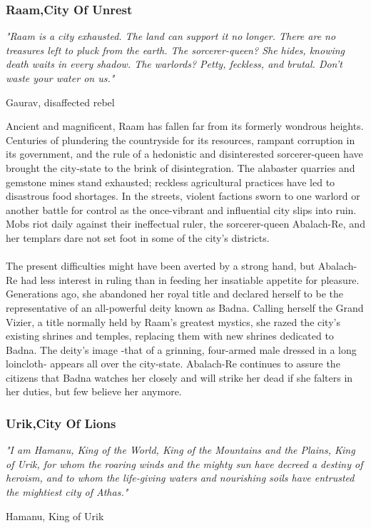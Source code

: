 \begin{multicols}{2}
\subsubsection{Raam,City Of Unrest}
\epigraph{\textit{
"Raam is a city exhausted. The land can support it no
longer. There are no treasures left to pluck from the earth.
The sorcerer-queen? She hides, knowing death waits in
every shadow. The warlords? Petty, feckless, and brutal.
Don’t waste your water on us." } }
{ Gaurav, disaffected rebel }

Ancient and magnificent, Raam has fallen far from its
formerly wondrous heights. Centuries of plundering
the countryside for its resources, rampant corruption
in its government, and the rule of a hedonistic
and disinterested sorcerer-queen have brought the
city-state to the brink of disintegration. The alabaster
quarries and gemstone mines stand exhausted;
reckless agricultural practices have led to disastrous
food shortages. In the streets, violent factions sworn
to one warlord or another battle for control as the
once-vibrant and influential city slips into ruin. Mobs
riot daily against their ineffectual ruler, the sorcerer-queen
Abalach-Re, and her templars dare not set foot
in some of the city's districts.\\
\\
The present difficulties might have been averted
by a strong hand, but Abalach-Re had less interest
in ruling than in feeding her insatiable appetite for
pleasure. Generations ago, she abandoned her royal
title and declared herself to be the representative of
an all-powerful deity known as Badna. Calling herself
the Grand Vizier, a title normally held by Raam's
greatest mystics, she razed the city's existing shrines
and temples, replacing them with new shrines dedicated
to Badna. The deity's image -that of a grinning,
four-armed male dressed in a long loincloth- appears
all over the city-state. Abalach-Re continues to assure
the citizens that Badna watches her closely and will
strike her dead if she falters in her duties, but few
believe her anymore.\\

\subsubsection{Urik,City Of Lions}
\epigraph{\textit{
"I am Hamanu, King of the World, King of the Mountains
and the Plains, King of Urik, for whom the roaring winds
and the mighty sun have decreed a destiny of heroism, and
to whom the life-giving waters and nourishing soils have
entrusted the mightiest city of Athas." }}
{ Hamanu, King of Urik }


\end{multicols}
